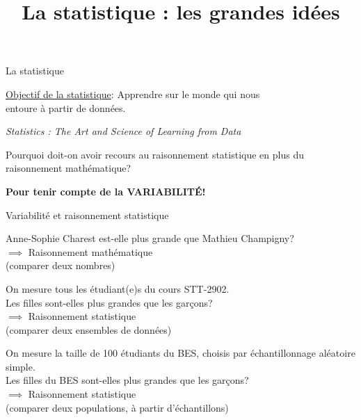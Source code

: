 \documentclass{BeamerTemplate}
\title{La statistique : les grandes idées}
\date{}
\begin{document}
\begin{frame}

\titlepage

\end{frame}



\begin{frame}{La statistique}

\underline{Objectif de la statistique}: Apprendre sur le monde qui nous\\
\hspace{4.3cm} entoure à partir de données. 

\vspace{0.1in}
\begin{center}
\textit{Statistics : The Art and Science of Learning from Data}
\end{center}


\vspace{0.3in}

\pause

Pourquoi doit-on avoir recours au \alert{raisonnement statistique} en plus du \alert{raisonnement mathématique}?  

\pause
\begin{center}
\textbf{Pour tenir compte de la VARIABILITÉ!}
\end{center}

\end{frame}


\begin{frame}{Variabilité et raisonnement statistique}

Anne-Sophie Charest est-elle plus grande que Mathieu Champigny? \\
\alert{$\implies$ Raisonnement mathématique\\
\hspace{1cm} (comparer deux nombres)}


\pause

\vspace{0.3in}
On mesure tous les étudiant(e)s du cours STT-2902. \\
Les filles sont-elles plus grandes que les garçons? \\
\alert{$\implies$ Raisonnement statistique\\
\hspace{1cm} (comparer deux ensembles de données)}

\pause

\vspace{0.3in}
On mesure la taille de 100 étudiants du BES, choisis par échantillonnage aléatoire simple. \\
Les filles du BES sont-elles plus grandes que les garçons?\\
\alert{$\implies$ Raisonnement statistique \\
\hspace{1cm}(comparer deux populations, à partir d'échantillons)}


\end{frame}
\end{document}
